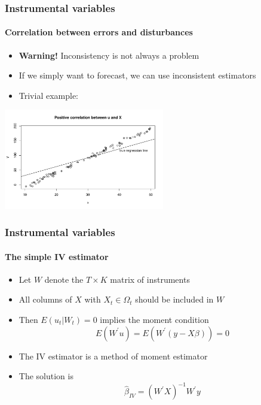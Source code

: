 \documentclass[notes=show]{beamer}
\begin{document}
\begin{frame}\frametitle{Instrumental variables}\framesubtitle{Correlation between errors and disturbances}
\begin{itemize}
    \item \textbf{Warning! }Inconsistency is not always a problem
    \item If we simply want to forecast, we can use inconsistent estimators
    \item Trivial example:\vspace*{-0.3cm}
\end{itemize}
\begin{center}
    \includegraphics[width=7cm]{plots/forecasting.pdf}
\end{center}
\end{frame}


\begin{frame}\frametitle{Instrumental variables}\framesubtitle{The simple IV estimator}
\begin{itemize}
    \item Let $W$ denote the $T\times K$ matrix of instruments
    \item All columns of $X$ with $X_{t}\in \Omega _{t}$ should be included in $ W $
    \item Then $E\left( u_{t}|W_{t}\right) =0$ implies the moment condition
    \begin{equation*}
        E\left( W^{\prime }u\right) =E\left( W^{\prime }\left( y-X\beta \right)\right) =0
    \end{equation*}
    \item The IV estimator is a method of moment estimator
    \item The solution is
    \begin{equation*}
        \hat{\beta}_{IV}=\left( W^{\prime }X\right) ^{-1}W^{\prime }y
    \end{equation*}
\end{itemize}
\end{frame}
\end{document}
